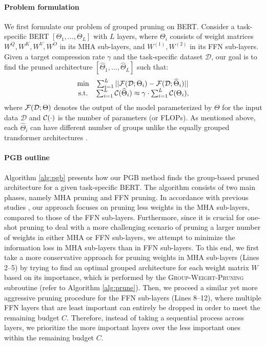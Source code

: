 \paragraph{Problem formulation}
We first formulate our problem of grouped pruning on BERT. Consider a task-specific BERT $[\Theta_1, ..., \Theta_L]$ with $L$ layers, where $\Theta_i$ consists of weight matrices $W^{Q}, W^{K}, W^{V}, W^{O}$ in its MHA sub-layers, and $W^{(1)}, W^{(2)}$ in its FFN sub-layers. Given a target compression rate $\gamma$ and the task-specific dataset $\mathcal{D}$, our goal is to find the pruned architecture $[\widehat{\Theta}_{1}, ..., \widehat{\Theta}_{L}]$ such that:
\begin{equation}\label{eq:optim}
\begin{matrix}
\min & \sum_{i=1}^{L}  ||\mathcal{F}(\mathcal{D};\Theta_i) - \mathcal{F}(\mathcal{D};\widehat{\Theta}_{i})|| \\
\text{s.t.}& \sum_{i=1}^{L}\mathcal{C}(\widehat{\Theta}_{i}) \approx \gamma \cdot \sum_{i=1}^{L}\mathcal{C}({\Theta_i}),
\end{matrix}
\end{equation}
where $\mathcal{F}(\mathcal{D};\Theta)$ denotes the output of the model parameterized by $\Theta$ for the input data $\mathcal{D}$ and $\mathcal{C}(\cdot)$ is the number of parameters (or FLOPs). As mentioned above, each $\widehat{\Theta}_{i}$ can have different number of groups unlike the equally grouped transformer architectures \cite{GroupFormer,groupbert}.


\paragraph{PGB outline}
Algorithm \ref{alg:pgb} presents how our PGB method finds the group-based pruned architecture for a given task-specific BERT. The algorithm consists of two main phases, namely MHA pruning and FFN pruning. In accordance with previous studies \cite{block,Xia}, our approach focuses on pruning less weights in the MHA sub-layers, compared to those of the FFN sub-layers. Furthermore, since it is crucial for one-shot pruning to deal with a more challenging scenario of pruning a larger number of weights in either MHA or FFN sub-layers, we attempt to minimize the information loss in MHA sub-layers than in FFN sub-layers. To this end, we first take a more conservative approach for pruning weights in MHA sub-layers (Lines 2--5) by trying to find an optimal grouped architecture for each weight matrix $W$ based on its importance, which is performed by the \textsc{Group-Weight-Pruning} subroutine (refer to Algorithm \ref{alg:prune}). Then, we proceed a similar yet more aggressive pruning procedure for the FFN sub-layers (Lines 8--12), where multiple FFN layers that are least important can entirely be dropped in order to meet the remaining budget $C$. Therefore, instead of taking a sequential process across layers, we prioritize the more important layers over the less important ones within the remaining budget $C$.

